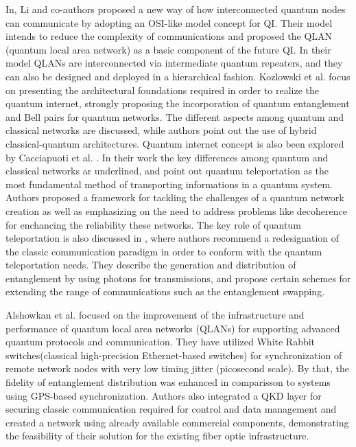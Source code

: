 \documentclass[12pt,a4paper] {report}
\begin{document}
		In\cite{li-arch}, Li and co-authors proposed a new way of how interconnected
		quantum nodes can communicate by adopting an OSI-like
		model concept for QI. Their model intends to reduce the complexity of communications
		and proposed the QLAN (quantum local area network) as a basic component of the future QI. In their model
		QLANs are interconnected via intermediate quantum repeaters, and they can also be designed and deployed in
		a hierarchical fashion.
		Kozlowski et al. \cite{rfc} focus on presenting the architectural foundations required in order to
		realize the quantum internet, strongly proposing the incorporation of quantum entanglement and Bell pairs for quantum networks. 
		The different aspects among quantum and classical networks are discussed, while authors point out the use of hybrid
		classical-quantum architectures. Quantum internet concept is also been explored by Cacciapuoti et al. \cite{net-chall-dqc}.
		In their work the key differences among quantum and classical
		networks ar underlined, and point out quantum teleportation as the most fundamental method of transporting 
		informations in a quantum system. Authors proposed a framework for tackling the challenges of a quantum
		network creation as well as emphasizing on the need to address problems like decoherence for enchancing the
		reliability these networks. The key role of quantum teleportation is also discussed in \cite{entagl-classic},
		where authors recommend a redesignation of the classic communication paradigm in order to conform with the quantum teleportation needs.
		They describe the generation and distribution of entanglement by using photons for transmissions, and propose certain schemes for extending
		the range of communications such as the entanglement swapping.
		
		Alshowkan et al.\cite{advance-arch} focused on the improvement of the infrastructure 
		and performance of quantum local area networks (QLANs) for supporting advanced quantum protocols
		and communication. They have utilized White Rabbit switches(classical high-precision Ethernet-based switches) for synchronization
		of remote network nodes with very low timing jitter (picosecond scale). 
		By that, the fidelity of entanglement distribution was enhanced in comparisson to systems using GPS-based synchronization.
		Authors also integrated a QKD layer for securing classic communication required for control and data management and
		created a network using already available commercial components, demonstrating the feasibility of their solution
		for the existing fiber optic infrastructure.
\end{document}
